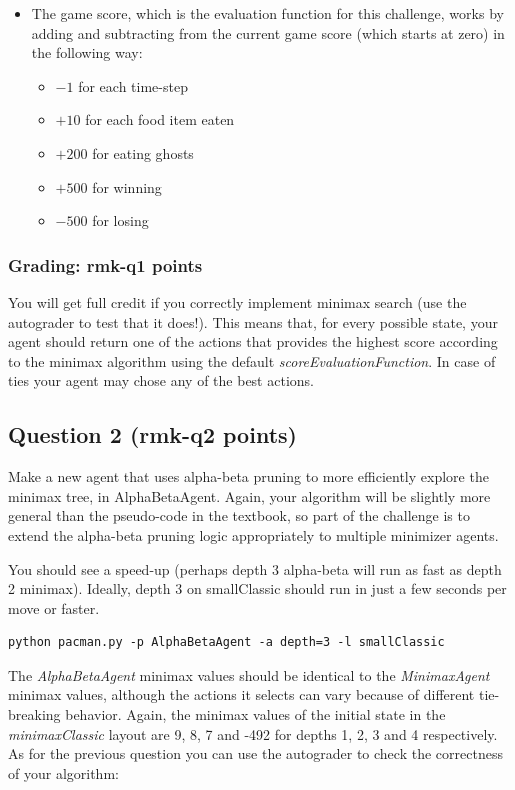 \documentclass{article}
\newcommand{\points}[1]{\csname rmk-#1\endcsname}
\begin{document}
\begin{itemize}
\item The game score, which is the evaluation function for this challenge, works by adding and subtracting from the current game score (which starts at zero) in the following way: 
\begin{itemize}
\item[] $-1$ for each time-step
\item[]  $+10$ for each food item eaten
\item[]  $+200$ for eating ghosts
\item[]  $+500$ for winning
\item[]  $-500$ for losing
\end{itemize}



\end{itemize}

\subsubsection{Grading: \points{q1} points}
You will get full credit if you correctly implement minimax search (use the autograder to test that it does!). This means that, for every possible state, your agent should return one of the actions that provides the highest score according to the minimax algorithm using the default \emph{scoreEvaluationFunction}. In case of ties your agent may chose any of the best actions.


\subsection{Question 2 (\points{q2} points)}
Make a new agent that uses alpha-beta pruning to more efficiently explore the minimax tree, in AlphaBetaAgent. Again, your algorithm will be slightly more general than the pseudo-code in the textbook, so part of the challenge is to extend the alpha-beta pruning logic appropriately to multiple minimizer agents.

You should see a speed-up (perhaps depth 3 alpha-beta will run as fast as depth 2 minimax). Ideally, depth 3 on smallClassic should run in just a few seconds per move or faster.

\begin{verbatim}
python pacman.py -p AlphaBetaAgent -a depth=3 -l smallClassic
\end{verbatim}

The \emph{AlphaBetaAgent} minimax values should be identical to the \emph{MinimaxAgent} minimax values, although the actions it selects can vary because of different tie-breaking behavior. Again, the minimax values of the initial state in the \emph{minimaxClassic} layout are 9, 8, 7 and -492 for depths 1, 2, 3 and 4 respectively. As for the previous question you can use the autograder to check the correctness of your algorithm:
\end{document}
